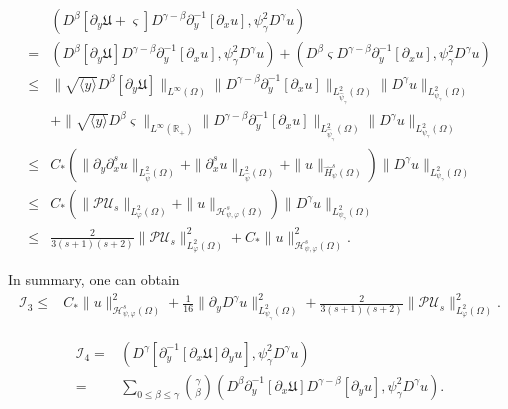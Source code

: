 \documentclass{amsart}
\numberwithin{equation}{section}
\newcommand\y{{{\langle y \rangle}}}
\begin{document}
\begin{align*}
&(D^{\beta}[\partial_{y}\mathfrak{U}+\varsigma]D^{\gamma-\beta}\partial_{y}^{-1}[\partial_{x}u],\psi_{\gamma}^{2}D^{\gamma}u)\\
=& (D^{\beta}[\partial_{y}\mathfrak{U}]D^{\gamma-\beta}\partial_{y}^{-1}[\partial_{x}u],\psi_{\gamma}^{2}D^{\gamma}u)
  +(D^{\beta}\varsigma D^{\gamma-\beta}\partial_{y}^{-1}[\partial_{x}u],\psi_{\gamma}^{2}D^{\gamma}u)\\
\leq& \|\sqrt{\y}D^{\beta}[\partial_{y}\mathfrak{U}]\|_{L^{\infty}(\Omega)}
      \|D^{\gamma-\beta}\partial_{y}^{-1}[\partial_{x}u]\|_{L_{\hat{\psi}_{\gamma}}^{2}(\Omega)}
      \|D^{\gamma}u\|_{L_{\psi_{\gamma}}^{2}(\Omega)}\\
    &+\|\sqrt{\y}D^{\beta}\varsigma\|_{L^{\infty}(\mathbb{R}_{+})}
      \|D^{\gamma-\beta}\partial_{y}^{-1}[\partial_{x}u]\|_{L_{\hat{\psi}_{\gamma}}^{2}(\Omega)}
      \|D^{\gamma}u\|_{L_{\psi_{\gamma}}^{2}(\Omega)}\\
\leq& C_{*}\left(\|\partial_{y}\partial_{x}^{s}u\|_{L_{\hat{\psi}}^{2}(\Omega)}
            +\|\partial_{x}^{s}u\|_{L_{\hat{\psi}}^{2}(\Omega)}
            +\|u\|_{\hat{H}_{\psi}^{s}(\Omega)}\right)
       \|D^{\gamma}u\|_{L_{\psi_{\gamma}}^{2}(\Omega)}\\
\leq& C_{*}\left(\|\mathcal{P}\mathcal{U}_{s}\|_{L_{\varphi}^{2}(\Omega)}+\|u\|_{\mathcal{H}_{\psi,\varphi}^{s}(\Omega)}\right)
       \|D^{\gamma}u\|_{L_{\psi_{\gamma}}^{2}(\Omega)}\\
\leq& \frac{2}{3(s+1)(s+2)}\|\mathcal{P}\mathcal{U}_{s}\|_{L_{\varphi}^{2}(\Omega)}^{2}
     +C_{*}\|u\|_{\mathcal{H}_{\psi,\varphi}^{s}(\Omega)}^{2}.
\end{align*}

In summary, one can obtain
\begin{align*}
\mathcal{I}_{3}
\leq& C_{*}\|u\|_{\mathcal{H}_{\psi,\varphi}^{s}(\Omega)}^{2}
     +\frac{1}{16}\|\partial_{y}D^{\gamma}u\|_{L_{\psi_{\gamma}}^{2}(\Omega)}^{2}
     +\frac{2}{3(s+1)(s+2)}\|\mathcal{P}\mathcal{U}_{s}\|_{L_{\varphi}^{2}(\Omega)}^{2}.
\end{align*}

\begin{align*}
\mathcal{I}_{4}
=& (D^{\gamma}[\partial_{y}^{-1}[\partial_{x}\mathfrak{U}]\partial_{y}u],\psi_{\gamma}^{2} D^{\gamma}u)\\
=&\sum_{0\leq\beta\leq\gamma}\binom{\gamma}{\beta}(D^{\beta}\partial_{y}^{-1}[\partial_{x}\mathfrak{U}]D^{\gamma-\beta}[\partial_{y}u],\psi_{\gamma}^{2}D^{\gamma}u).
\end{align*}
\end{document}
